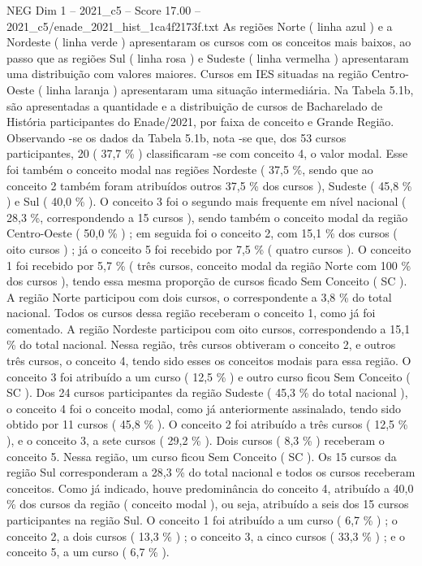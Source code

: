 \begin{textsample}{NEG Dim 1 – 2021\_c5 – Score 17.00 – 2021\_c5/enade\_2021\_hist\_1ca4f2173f.txt}
As regiões Norte ( linha azul ) e a Nordeste ( linha verde ) apresentaram os cursos com os conceitos mais baixos, ao passo que as regiões Sul ( linha rosa ) e Sudeste ( linha vermelha ) apresentaram uma distribuição com valores maiores.
Cursos em IES situadas na região Centro-Oeste ( linha laranja ) apresentaram uma situação intermediária.
Na Tabela 5.1b, são apresentadas a quantidade e a distribuição de cursos de Bacharelado de História participantes do Enade/2021, por faixa de conceito e Grande Região.
Observando -se os dados da Tabela 5.1b, nota -se que, dos 53 cursos participantes, 20 ( 37,7 \% ) classificaram -se com conceito 4, o valor modal.
Esse foi também o conceito modal nas regiões Nordeste ( 37,5 \%, sendo que ao conceito 2 também foram atribuídos outros 37,5 \% dos cursos ), Sudeste ( 45,8 \% ) e Sul ( 40,0 \% ).
O conceito 3 foi o segundo mais frequente em nível nacional ( 28,3 \%, correspondendo a 15 cursos ), sendo também o conceito modal da região Centro-Oeste ( 50,0 \% ) ; em seguida foi o conceito 2, com 15,1 \% dos cursos ( oito cursos ) ; já o conceito 5 foi recebido por 7,5 \% ( quatro cursos ).
O conceito 1 foi recebido por 5,7 \% ( três cursos, conceito modal da região Norte com 100 \% dos cursos ), tendo essa mesma proporção de cursos ficado Sem Conceito ( SC ).
A região Norte participou com dois cursos, o correspondente a 3,8 \% do total nacional.
Todos os cursos dessa região receberam o conceito 1, como já foi comentado.
A região Nordeste participou com oito cursos, correspondendo a 15,1 \% do total nacional.
Nessa região, três cursos obtiveram o conceito 2, e outros três cursos, o conceito 4, tendo sido esses os conceitos modais para essa região.
O conceito 3 foi atribuído a um curso ( 12,5 \% ) e outro curso ficou Sem Conceito ( SC ).
Dos 24 cursos participantes da região Sudeste ( 45,3 \% do total nacional ), o conceito 4 foi o conceito modal, como já anteriormente assinalado, tendo sido obtido por 11 cursos ( 45,8 \% ).
O conceito 2 foi atribuído a três cursos ( 12,5 \% ), e o conceito 3, a sete cursos ( 29,2 \% ).
Dois cursos ( 8,3 \% ) receberam o conceito 5.
Nessa região, um curso ficou Sem Conceito ( SC ).
Os 15 cursos da região Sul corresponderam a 28,3 \% do total nacional e todos os cursos receberam conceitos.
Como já indicado, houve predominância do conceito 4, atribuído a 40,0 \% dos cursos da região ( conceito modal ), ou seja, atribuído a seis dos 15 cursos participantes na região Sul.
O conceito 1 foi atribuído a um curso ( 6,7 \% ) ; o conceito 2, a dois cursos ( 13,3 \% ) ; o conceito 3, a cinco cursos ( 33,3 \% ) ; e o conceito 5, a um curso ( 6,7 \% ).

\end{textsample}
